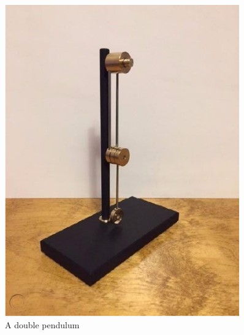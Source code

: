\documentclass[a4paper,12pt]{article}
\begin{document}
    \begin{figure}[H]
        \centering
        \begin{minipage}{0.45\textwidth}
            \centering
            \includegraphics[width=0.9\textwidth]{double-pendulum} %
            \caption{A double pendulum}
            \label{fig:dbpendulum}
        \end{minipage}\hfill
        \begin{minipage}{0.45\textwidth}
            \centering

\end{minipage}
\end{figure}
\end{document}
